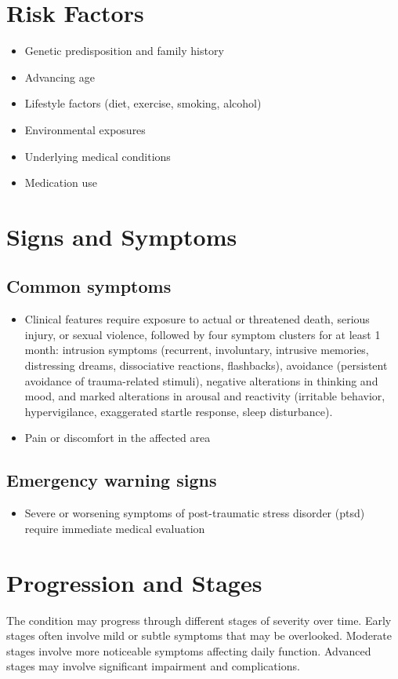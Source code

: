 \section{Risk Factors}
\begin{itemize}[noitemsep]
  \item Genetic predisposition and family history
  \item Advancing age
  \item Lifestyle factors (diet, exercise, smoking, alcohol)
  \item Environmental exposures
  \item Underlying medical conditions
  \item Medication use
\end{itemize}
\section{Signs and Symptoms}

\subsection{Common symptoms}
\begin{itemize}[noitemsep]
  \item Clinical features require exposure to actual or threatened death, serious injury, or sexual violence, followed by four symptom clusters for at least 1 month: intrusion symptoms (recurrent, involuntary, intrusive memories, distressing dreams, dissociative reactions, flashbacks), avoidance (persistent avoidance of trauma-related stimuli), negative alterations in thinking and mood, and marked alterations in arousal and reactivity (irritable behavior, hypervigilance, exaggerated startle response, sleep disturbance).
  \item Pain or discomfort in the affected area
  \end{itemize}

\subsection{Emergency warning signs}
\begin{itemize}[noitemsep]
  \item Severe or worsening symptoms of post-traumatic stress disorder (ptsd) require immediate medical evaluation
\end{itemize}
\section{Progression and Stages}
The condition may progress through different stages of severity over time. Early stages often involve mild or subtle symptoms that may be overlooked. Moderate stages involve more noticeable symptoms affecting daily function. Advanced stages may involve significant impairment and complications.
